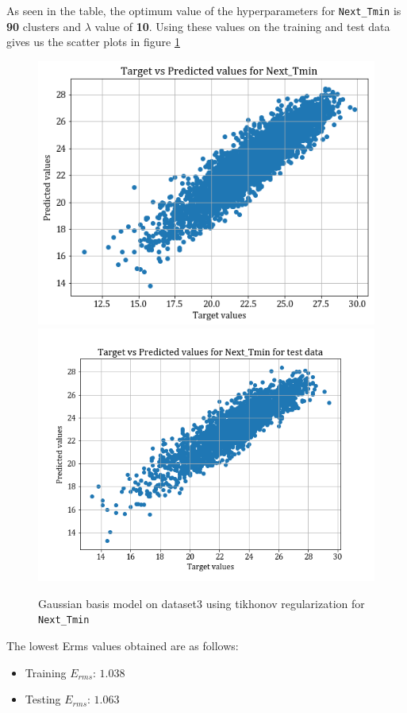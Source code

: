 \documentclass[12pt,a4paper]{article}
\def\tt#1{\texttt{#1}}
\begin{document}

As seen in the table, the optimum value of the hyperparameters for  \tt{Next\_Tmin} is \textbf{90} clusters and $\lambda$ value of \textbf{10}. Using these values on the training and test data gives us the scatter plots in figure \ref{fig:ds3_tikh_min}
\begin{figure}
    \centering
    \includegraphics[scale=0.4]{images/train_ds3_tikh_min.png}
    \includegraphics[scale=0.4]{images/test_ds3_tikh_min.png}
    \caption{Gaussian basis model on dataset3 using tikhonov regularization for \tt{Next\_Tmin}}
    \label{fig:ds3_tikh_min}
\end{figure}
The lowest Erms values obtained are as follows:
\begin{itemize}
    \itemsep0em
    \item Training $E_{rms}$: $1.038$
    \item Testing $E_{rms}$: $1.063$
\end{itemize}
\end{document}
